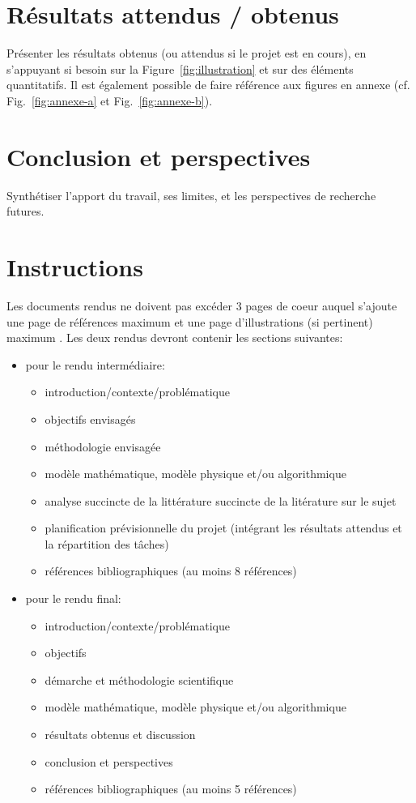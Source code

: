 \documentclass[11pt,a4paper]{article}
\begin{document}
\section{Résultats attendus / obtenus}
\label{sec:resultats}
Présenter les résultats obtenus (ou attendus si le projet est en  cours), en s'appuyant si besoin sur la Figure~\ref{fig:illustration} et sur des éléments quantitatifs. Il est également possible de faire référence aux figures en annexe (cf. Fig.~\ref{fig:annexe-a} et Fig.~\ref{fig:annexe-b}).

\section{Conclusion et perspectives}
\label{sec:conclusion}
Synthétiser l'apport du travail, ses limites, et les perspectives de recherche futures.

\section{Instructions}
Les documents rendus ne doivent pas excéder 3 pages de coeur  auquel s'ajoute une page de références maximum et une page d'illustrations (si pertinent) maximum .
Les deux rendus devront contenir les sections suivantes:
\begin{itemize}
  \item pour le rendu intermédiaire:
    \begin{itemize}
      \item introduction/contexte/problématique
      \item objectifs envisagés
      \item méthodologie envisagée
      \item modèle mathématique, modèle physique et/ou algorithmique
      \item analyse succincte de la littérature succincte de la litérature sur le sujet
      \item planification prévisionnelle du projet (intégrant les résultats attendus et la répartition des tâches)
      \item références bibliographiques (au moins 8 références)
    \end{itemize}
  \item pour le rendu final:
    \begin{itemize}
      \item introduction/contexte/problématique
      \item objectifs
      \item démarche et méthodologie scientifique
      \item modèle mathématique, modèle physique et/ou algorithmique
      \item résultats obtenus et discussion
      \item conclusion et perspectives
      \item références bibliographiques (au moins 5 références)
    \end{itemize}
\end{itemize}
\end{document}
